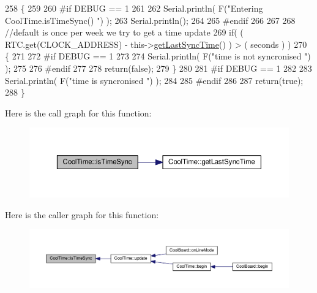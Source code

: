 \begin{DoxyCode}
258 \{
259 
260 \textcolor{preprocessor}{#if DEBUG == 1}
261 
262     Serial.println( F(\textcolor{stringliteral}{"Entering CoolTime.isTimeSync() "}) );
263     Serial.println();
264 
265 \textcolor{preprocessor}{#endif }
266 
267 
268     \textcolor{comment}{//default is once per week we try to get a time update}
269     \textcolor{keywordflow}{if}( ( RTC.get(CLOCK\_ADDRESS) - this->\hyperlink{classCoolTime_a5d17f707a9d337720493b2bce9d41c21}{getLastSyncTime}() ) > ( seconds ) ) 
270     \{
271 
272 \textcolor{preprocessor}{    #if DEBUG == 1 }
273 
274         Serial.println( F(\textcolor{stringliteral}{"time is not syncronised "}) );
275     
276 \textcolor{preprocessor}{    #endif}
277 
278         \textcolor{keywordflow}{return}(\textcolor{keyword}{false});  
279     \}
280     
281 \textcolor{preprocessor}{#if DEBUG == 1 }
282 
283     Serial.println( F(\textcolor{stringliteral}{"time is syncronised "}) );
284 
285 \textcolor{preprocessor}{#endif }
286 
287     \textcolor{keywordflow}{return}(\textcolor{keyword}{true});
288 \}
\end{DoxyCode}
Here is the call graph for this function\+:\nopagebreak
\begin{figure}[H]
\begin{center}
\leavevmode
\includegraphics[width=350pt]{classCoolTime_a5ae038a4498602b189f76a10bf02adf8_cgraph}
\end{center}
\end{figure}
Here is the caller graph for this function\+:\nopagebreak
\begin{figure}[H]
\begin{center}
\leavevmode
\includegraphics[width=350pt]{classCoolTime_a5ae038a4498602b189f76a10bf02adf8_icgraph}
\end{center}
\end{figure}
\mbox{\label{classCoolTime_af355e7f9b3898211cd2ff25eab5933b1}} 
